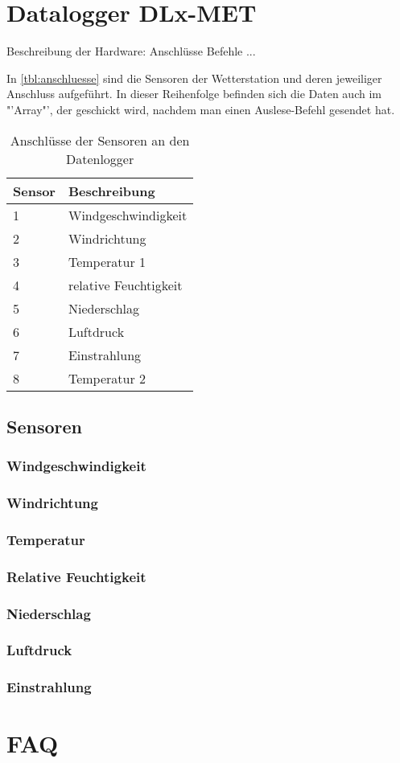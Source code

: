 \section{Datalogger DLx-MET}

Beschreibung der Hardware:
Anschlüsse
Befehle
...

In \autoref{tbl:anschluesse} sind die Sensoren der Wetterstation und deren jeweiliger Anschluss aufgeführt. In dieser Reihenfolge befinden sich die Daten auch im "'Array"', der geschickt wird, nachdem man einen Auslese-Befehl gesendet hat.

\begin{table}[H]
	\centering
	\begin{tabularx}{0.35\textwidth}{lX}  
		\toprule
		Sensor & Beschreibung \\
		\midrule
		1 	&  Windgeschwindigkeit      	\\
		2 	&  Windrichtung 	    \\
		3   &	Temperatur 1 \\
		4   & relative Feuchtigkeit\\
		5   & Niederschlag  \\
		6   & Luftdruck \\
		7   & Einstrahlung \\
		8   & Temperatur 2\\
		\bottomrule
	\end{tabularx}
	\caption{Anschlüsse der Sensoren an den Datenlogger}
	\label{tbl:anschluesse}
\end{table}

\subsection{Sensoren}

\subsubsection{Windgeschwindigkeit}
\subsubsection{Windrichtung}
\subsubsection{Temperatur}
\subsubsection{Relative Feuchtigkeit}
\subsubsection{Niederschlag}
\subsubsection{Luftdruck}
\subsubsection{Einstrahlung}

\newpage
\section{FAQ}

